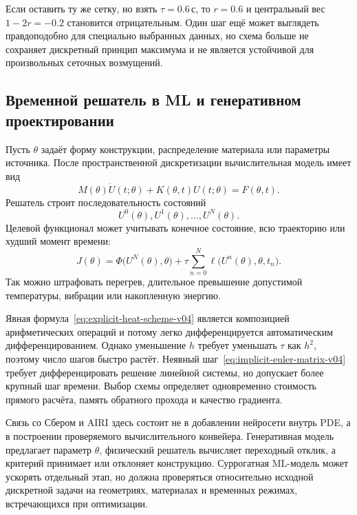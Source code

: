 Если оставить ту же сетку, но взять $\tau=0.6\,\text{с}$, то $r=0.6$ и центральный вес $1-2r=-0.2$ становится отрицательным. Один шаг ещё может выглядеть правдоподобно для специально выбранных данных, но схема больше не сохраняет дискретный принцип максимума и не является устойчивой для произвольных сеточных возмущений.

\subsection{Временной решатель в ML и генеративном проектировании}

Пусть $\theta$ задаёт форму конструкции, распределение материала или параметры источника. После пространственной дискретизации вычислительная модель имеет вид
\begin{equation}
\label{eq:design-time-system-v04}
 M(\theta)\dot U(t;\theta)
 +K(\theta,t)U(t;\theta)
 =F(\theta,t).
\end{equation}
Решатель строит последовательность состояний
\[
 U^0(\theta),U^1(\theta),\ldots,U^N(\theta).
\]
Целевой функционал может учитывать конечное состояние, всю траекторию или худший момент времени:
\begin{equation}
\label{eq:transient-objective-v04}
 J(\theta)
 =
 \Phi\bigl(U^N(\theta),\theta\bigr)
 +\tau\sum_{n=0}^{N}
 \ell\bigl(U^n(\theta),\theta,t_n\bigr).
\end{equation}
Так можно штрафовать перегрев, длительное превышение допустимой температуры, вибрации или накопленную энергию.

\begin{mlconnection}
Явная формула~\eqref{eq:explicit-heat-scheme-v04} является композицией арифметических операций и потому легко дифференцируется автоматическим дифференцированием. Однако уменьшение $h$ требует уменьшать $\tau$ как $h^2$, поэтому число шагов быстро растёт. Неявный шаг~\eqref{eq:implicit-euler-matrix-v04} требует дифференцировать решение линейной системы, но допускает более крупный шаг времени. Выбор схемы определяет одновременно стоимость прямого расчёта, память обратного прохода и качество градиента.
\end{mlconnection}

Связь со Сбером и AIRI здесь состоит не в добавлении нейросети внутрь PDE, а в построении проверяемого вычислительного конвейера. Генеративная модель предлагает параметр $\theta$, физический решатель вычисляет переходный отклик, а критерий принимает или отклоняет конструкцию. Суррогатная ML-модель может ускорять отдельный этап, но должна проверяться относительно исходной дискретной задачи на геометриях, материалах и временных режимах, встречающихся при оптимизации.

